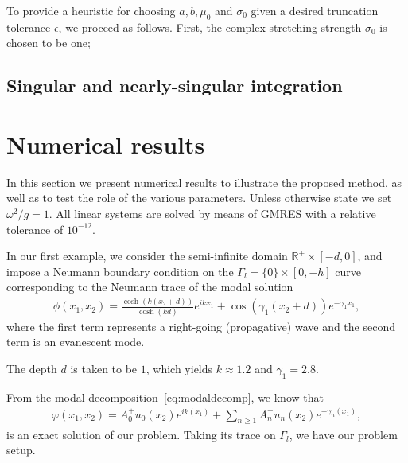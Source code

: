 \documentclass[11pt]{article}
\newcommand{\R}{\mathbb{R}}
\begin{document}
To provide a heuristic for choosing $a,b,\mu_0$ and $\sigma_0$ given a desired
truncation tolerance $\epsilon$, we proceed as follows. First, the
complex-stretching strength $\sigma_0$ is chosen to be one; 

\subsection{Singular and nearly-singular integration} \label{sec:singular-integration}

\section{Numerical results}\label{sec:numerical-results}

In this section we present numerical results to illustrate the proposed method,
as well as to test the role of the various parameters. Unless otherwise state we
set $\omega^2/g =1$. All linear systems are solved by means of GMRES with a
relative tolerance of $10^{-12}$.

In our first example, we consider the semi-infinite domain $\R^+ \times [-d,0]$,
and impose a Neumann boundary condition on the $\Gamma_l = \{ 0 \} \times
[0,-h]$ curve corresponding to the Neumann trace of the modal solution
\begin{align}
  \phi(x_1,x_2) = \frac{\cosh(k(x_2+d))}{\cosh(kd)} e^{i k x_1} + \cos(\gamma_1(x_2+d)) e^{-\gamma_1 x_1},
\end{align}
where the first term represents a right-going (propagative) wave and the second
term is an evanescent mode. 

The depth $d$ is taken to be $1$, which yields $k \approx 1.2$ and
$\gamma_1=2.8$. 

From the
modal decomposition~\cref{eq:modaldecomp}, we know that
\begin{align}
  \varphi(x_1,x_2) = A_0^+u_0(x_2)e^{ik(x_1)} + \sum_{n\geq 1}A_n^+u_n(x_2)e^{-\gamma_n(x_1)},
\end{align}
is an exact solution of our problem. Taking its trace on $\Gamma_l$, we have our
problem setup.
\end{document}
